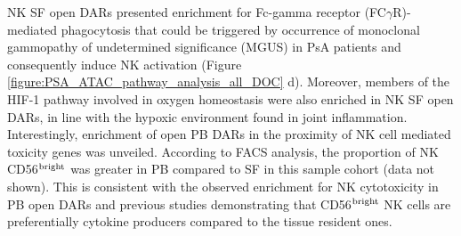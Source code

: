 NK SF open DARs presented enrichment for Fc-gamma receptor (FC$\gamma$R)-mediated phagocytosis that could be triggered by occurrence of monoclonal gammopathy of undetermined significance (MGUS) in PsA patients and consequently induce NK activation (Figure \ref{figure:PSA_ATAC_pathway_analysis_all_DOC} d). Moreover, members of the HIF-1 pathway involved in oxygen homeostasis were also enriched in NK SF open DARs, in line with the hypoxic environment found in joint inflammation. Interestingly, enrichment of open PB DARs in the proximity of NK cell mediated toxicity genes was unveiled. According to FACS analysis, the proportion of NK CD56$\textsuperscript{bright}$ was greater in PB compared to SF in this sample cohort (data not shown). This is consistent with the observed enrichment for NK cytotoxicity in PB open DARs and previous studies demonstrating that CD56$\textsuperscript{bright}$ NK cells are preferentially cytokine producers compared to the tissue resident ones. 

